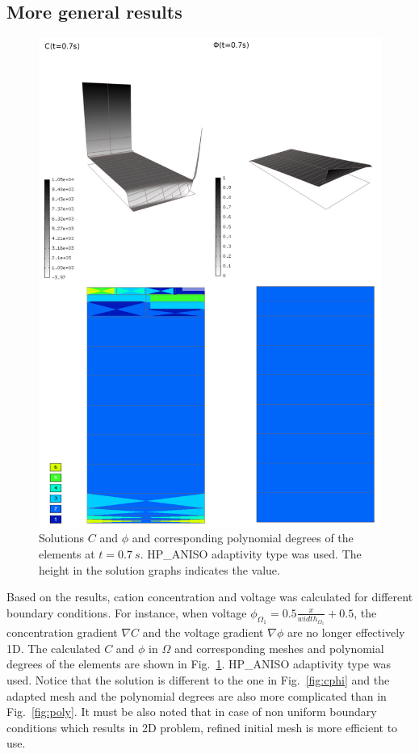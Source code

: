 \subsection{More general results}
\begin{figure}
  \begin{centering}
  \includegraphics[width=.75\columnwidth]{cphiorders}
  \caption{\label{fig:cphi-orders} Solutions $C$ and $\phi$
  and corresponding polynomial degrees of the elements at
  $t=0.7\ s$. HP\_ANISO adaptivity type was used. The height
  in the solution graphs indicates the value.}
  \end{centering}
\end{figure}

Based on the results, cation concentration and voltage was calculated
for different boundary conditions.
For instance, when voltage $\phi_{\Omega_1}=0.5\frac{x}{width_{\Omega_1}}+0.5$, the
concentration gradient $\nabla C$ and the voltage gradient $\nabla \phi$ are no
longer effectively 1D.
The calculated $C$ and $\phi$ in $\Omega$ and corresponding meshes and polynomial
degrees of the elements are shown in Fig.~\ref{fig:cphi-orders}.
HP\_ANISO adaptivity type was used. Notice that the solution
is different to the one in Fig.~\ref{fig:cphi} and the adapted mesh and the
polynomial degrees are also more complicated than in Fig.~\ref{fig:poly}.
It must be also noted that in case of non uniform boundary conditions which
results in 2D problem, refined initial mesh is more efficient to use.

